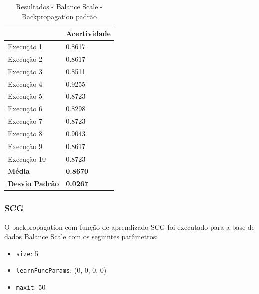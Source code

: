 \begin{table}[h!]
\centering
\caption{Resultados - Balance Scale - Backpropagation padrão}
\label{tabela-resultado-balance-scale-backpropagation-padrao}
\begin{tabular}{ll}
\toprule
                       & \textbf{Acertividade}       \\ \midrule
Execução 1             & 0.8617          \\
Execução 2             & 0.8617          \\
Execução 3             & 0.8511          \\
Execução 4             & 0.9255           \\
Execução 5             & 0.8723          \\
Execução 6             & 0.8298           \\
Execução 7             & 0.8723           \\
Execução 8             & 0.9043          \\
Execução 9             & 0.8617           \\
Execução 10            & 0.8723           \\ \bottomrule
\textbf{Média}         & \textbf{0.8670} \\
\textbf{Desvio Padrão} & \textbf{0.0267}
\end{tabular}
\end{table}

%

\subsubsection{SCG}

O backpropagation com função de aprendizado SCG foi executado para a base de dados Balance Scale com os seguintes parâmetros:

\begin{itemize}
	\item \texttt{size}: 5
	\item \texttt{learnFuncParams}: (0, 0, 0, 0)
	\item \texttt{maxit}: 50
\end{itemize}


